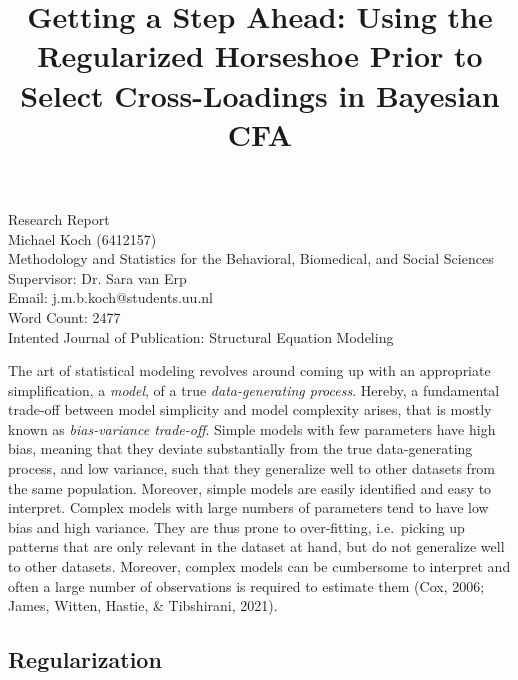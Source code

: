 \documentclass[
  man,floatsintext]{apa6}
\title{Getting a Step Ahead: Using the Regularized Horseshoe Prior to Select Cross-Loadings in Bayesian CFA}
\author{\phantom{0}}
\date{}
\affiliation{\phantom{0}}
\begin{document}
\maketitle

\vfill
Research Report\\
Michael Koch (6412157)\\
Methodology and Statistics for the Behavioral, Biomedical, and Social Sciences \\
Supervisor: Dr. Sara van Erp \\ 
Email: j.m.b.koch@students.uu.nl \\
Word Count: 2477 \\
Intented Journal of Publication: Structural Equation Modeling \\

\setcounter{page}{0}
\thispagestyle{empty}
\pagestyle{plain}

\clearpage

The art of statistical modeling revolves around coming up with an appropriate simplification, a \emph{model}, of a true \emph{data-generating process}. Hereby, a fundamental trade-off between model simplicity and model complexity arises, that is mostly known as \emph{bias-variance trade-off}. Simple models with few parameters have high bias, meaning that they deviate substantially from the true data-generating process, and low variance, such that they generalize well to other datasets from the same population. Moreover, simple models are easily identified and easy to interpret. Complex models with large numbers of parameters tend to have low bias and high variance. They are thus prone to over-fitting, i.e.~picking up patterns that are only relevant in the dataset at hand, but do not generalize well to other datasets. Moreover, complex models can be cumbersome to interpret and often a large number of observations is required to estimate them (Cox, 2006; James, Witten, Hastie, \& Tibshirani, 2021).

\hypertarget{regularization}{%
\subsection{Regularization}\label{regularization}}
\end{document}

